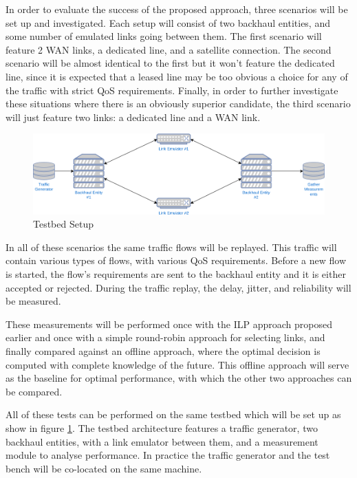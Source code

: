 In order to evaluate the success of the proposed approach, three scenarios will be set up and investigated. Each setup will consist of two backhaul entities, and some number of emulated links going between them. The first scenario will feature 2 WAN links, a dedicated line, and a satellite connection. The second scenario will be almost identical to the first but it won't feature the dedicated line, since it is expected that a leased line may be too obvious a choice for any of the traffic with strict QoS requirements. Finally, in order to further investigate these situations where there is an obviously superior candidate, the third scenario will just feature two links: a dedicated line and a WAN link.

\begin{figure}[h]
    \centering
        \includegraphics[width=\textwidth]{fig/testbed.png}
        \caption{Testbed Setup}
        \label{fig:testbed}
\end{figure}

In all of these scenarios the same traffic flows will be replayed. This traffic will contain various types of flows, with various QoS requirements. Before a new flow is started, the flow's requirements are sent to the backhaul entity and it is either accepted or rejected. During the traffic replay, the delay, jitter, and reliability will be measured.

These measurements will be performed once with the ILP approach proposed earlier and once with a simple round-robin approach for selecting links, and finally compared against an offline approach, where the optimal decision is computed with complete knowledge of the future. This offline approach will serve as the baseline for optimal performance, with which the other two approaches can be compared.

All of these tests can be performed on the same testbed which will be set up as show in figure \ref{fig:testbed}. The testbed architecture features a traffic generator, two backhaul entities, with a link emulator between them, and a measurement module to analyse performance. In practice the traffic generator and the test bench will be co-located on the same machine.

